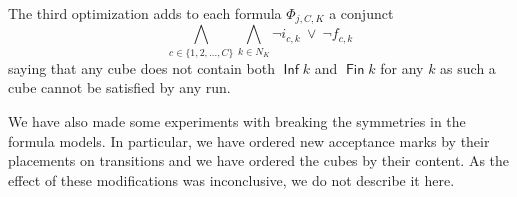 \documentclass[a4paper,UKenglish,cleveref,autoref,thm-restate]{lipics-v2021}
\newcommand{\todo}[1]{\marginpar{\textcolor{red}{#1}}}
\DeclareMathOperator{\Inf}{\mathsf{Inf}}
\DeclareMathOperator{\Fin}{\mathsf{Fin}}
\newcommand{\mks}{\mathit{mks}}
\newcommand{\rem}{\mathit{nm}}
\newcommand{\mA}{\mathcal{A}}
\begin{document}
The third optimization adds to each formula $\Phi_{j,C,K}$ a conjunct
\[
   \bigwedge_{c\in\{1,2,\ldots,C\}}\bigwedge_{k\in N_K} \neg
   i_{c,k}~\vee~\neg f_{c,k}
\]
saying that any cube does not contain both $\Inf k$ and $\Fin k$ for any
$k$ as such a cube cannot be satisfied by any run. 

We have also made some experiments with breaking the symmetries in the
formula models. In particular, we have ordered new acceptance marks by
their placements on transitions and we have ordered the cubes by their
content. As the effect of these modifications was inconclusive, we do
not describe it here.





\end{document}
